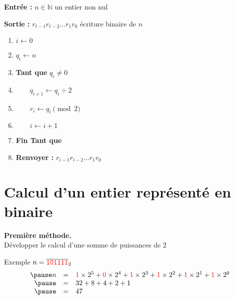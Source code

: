\begin{frame}


\bigskip

\begin{algo}
\textbf{Entrée :} $n\in\mathbb{N}$ un entier non nul

\textbf{Sortie :} $r_{t-1}r_{t-2}\ldots r_1r_0$ écriture binaire de $n$


\begin{enumerate}
\item $i \leftarrow 0$
\item $q_i \leftarrow n$
\item \textbf{Tant que} $q_i \neq 0$
\item $\qquad q_{i+1} \leftarrow q_i\div 2$
\item $\qquad r_i \leftarrow q_i \pmod{2}$
\item $\qquad i \leftarrow i + 1$
\item \textbf{Fin Tant que}
\item \textbf{Renvoyer :} $r_{i-1}r_{i-2}\ldots r_1r_0$
\end{enumerate}
\end{algo}



\end{frame}

\section{Calcul d'un entier représenté en binaire}

\begin{frame}


\bigskip
\pause

\textbf{Première méthode.}\\
 Développer le calcul d'une somme de puissances de $2$

\bigskip
\pause
Exemple $n = \overline{{\color{red}\mathtt{101111}}}_2$
\[\begin{array}{rcl}
\pause
n &=& 
{\color{red}1}\times 2^5 
+ {\color{red}0}\times 2^4 
+ {\color{red}1}\times 2^3 
+ {\color{red}1}\times 2^2 
+ {\color{red}1}\times 2^1 
+ {\color{red}1}\times 2^0\\
\pause
&=& 32 + 8 + 4 + 2 + 1\\
\pause
&=& 47
\end{array}\]

\end{frame}



